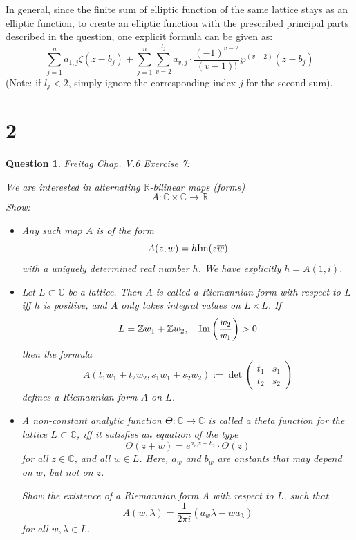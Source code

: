\documentclass{article}
\newtheorem{question}{Question}
\begin{document}
\begin{itemize}
    \hfil

    In general, since the finite sum of elliptic function of the same lattice stays as an elliptic function, to create an elliptic function with the prescribed principal parts described in the question, one explicit formula can be given as:
    $$\sum_{j=1}^{n}a_{1,j}\zeta(z-b_j)+\sum_{j=1}^{n}\sum_{v=2}^{l_j}a_{v,j}\cdot\frac{(-1)^{v-2}}{(v-1)!}\wp^{(v-2)}(z-b_j)$$
    (Note: if $l_j<2$, simply ignore the corresponding index $j$ for the second sum).
\end{itemize}

\break

\section*{2}
\begin{myBox}[]{}
    \begin{question}
        Freitag Chap. V.6 Exercise 7:

        We are interested in alternating $\mathbb{R}$-bilinear maps (forms)
        $$A:\mathbb{C}\times\mathbb{C}\rightarrow\mathbb{R}$$
        Show:
        \begin{itemize}
            \item[(a)] Any such map $A$ is of the form 
            $$A(z,w)=h\textmd{Im}(z\overline{w})$$
            with a uniquely determined real number $h$. We have explicitly $h=A(1,i)$.
            \item[(b)] Let $L\subset \mathbb{C}$ be a lattice. Then $A$ is called a \emph{Riemannian form} with respect to $L$ iff $h$ is positive, and $A$ only takes integral values on $L\times L$. If 
            $$L=\mathbb{Z}w_1+\mathbb{Z}w_2,\quad \textmd{Im}\left(\frac{w_2}{w_1}\right)>0$$
            then the formula 
            $$A(t_1w_1+t_2w_2,s_1w_1+s_2w_2):=\det\begin{pmatrix}t_1&s_1\\t_2&s_2\end{pmatrix}$$ defines a Riemannian form $A$ on $L$.
            \item[(c)] A non-constant analytic function $\Theta:\mathbb{C}\rightarrow\mathbb{C}$ is called a \emph{theta function} for the lattice $L\subset \mathbb{C}$, iff it satisfies an equation of the type 
            $$\Theta(z+w)=e^{a_wz+b_2}\cdot\Theta(z)$$ for all $z\in\mathbb{C}$, and all $w\in L$. Here, $a_w$ and $b_w$ are onstants that may depend on $w$, but not on $z$. 

            Show the existence of a Riemannian form $A$ with respect to $L$, such that 
            $$A(w,\lambda)=\frac{1}{2\pi i}(a_w\lambda - wa_\lambda)$$
            for all $w,\lambda\in L$.
        \end{itemize}
    \end{question}
\end{myBox}
\end{document}
